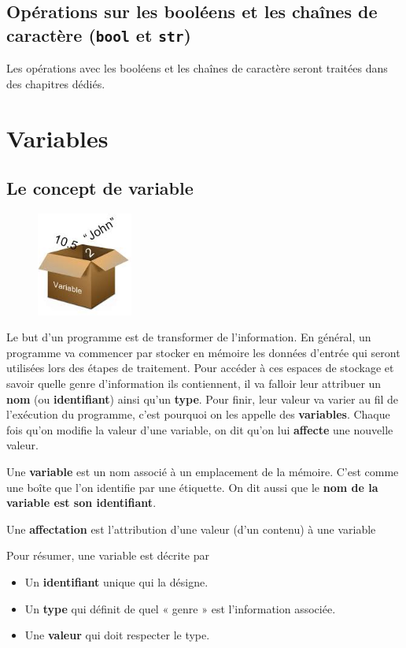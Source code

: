 \documentclass[11pt, a4paper]{book}
\begin{document}
\subsection{Opérations sur les booléens et les chaînes de caractère (\lstinline{bool} et \lstinline{str})}
Les opérations avec les booléens et les chaînes de caractère seront traitées dans des chapitres dédiés.


\section{Variables}


\subsection{Le concept de variable}
\begin{figure}
	\includegraphics[trim=0 0 0 45,width=0.28\textwidth]{images/variables/variables}
\end{figure}
Le but d'un programme est de transformer de l'information. En général, un programme va commencer par stocker en mémoire les données d’entrée qui seront utilisées lors des étapes de traitement. Pour accéder à ces espaces de stockage et savoir quelle genre d'information ils contiennent, il va falloir leur attribuer un \textbf{nom} (ou \textbf{identifiant}) ainsi qu'un \textbf{type}. Pour finir, leur valeur va varier au fil de l'exécution du programme, c'est pourquoi on les appelle des \textbf{variables}. Chaque fois qu'on modifie la valeur d'une variable, on dit qu'on lui \textbf{affecte} une nouvelle valeur.
\begin{mydefinitions}
	\item  Une \textbf{variable} est un nom associé à un emplacement de la mémoire. C’est comme une boîte que l’on identifie par une étiquette. On dit aussi que le \textbf{nom de la variable est son identifiant}.
	\item Une \textbf{affectation} est l’attribution d’une valeur (d’un contenu) à une variable
\end{mydefinitions}
Pour résumer, une variable est décrite par
\begin{itemize}
	\item Un \textbf{identifiant} unique qui la désigne.
	\item Un \textbf{type} qui définit de quel « genre » est l’information associée.
	\item Une \textbf{valeur} qui doit respecter le type.
\end{itemize}
\end{document}
